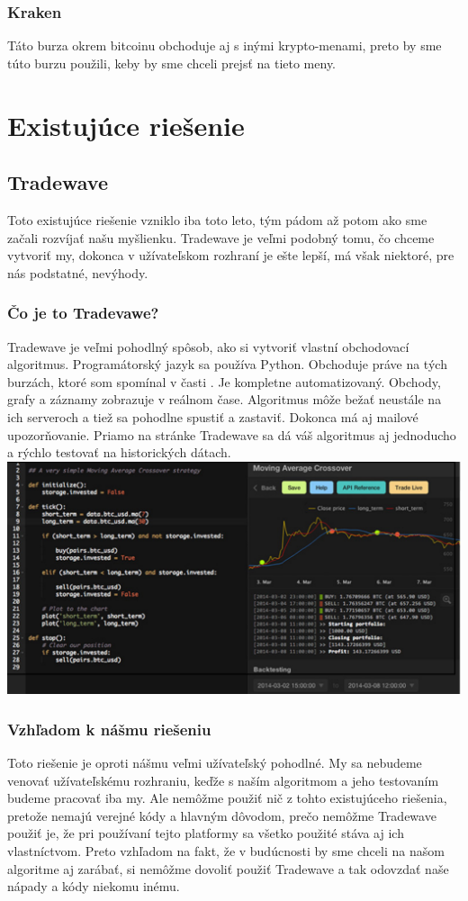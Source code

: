 \subsubsection{Kraken} 
Táto burza okrem bitcoinu obchoduje aj s inými krypto-menami, preto by sme túto burzu použili, keby by sme chceli prejsť na tieto meny. \cite{Kre} 
\section{Existujúce riešenie} 
\subsection{Tradewave} 
Toto existujúce riešenie vzniklo iba toto leto, tým pádom až potom ako sme začali rozvíjať našu myšlienku. Tradewave je veľmi podobný tomu, čo chceme vytvoriť my, dokonca v užívateľskom rozhraní je ešte lepší, má však niektoré, pre nás podstatné, nevýhody.  
\subsubsection{Čo je to Tradevawe?} 
Tradewave je veľmi pohodlný spôsob, ako si vytvoriť vlastní obchodovací algoritmus. Programátorský jazyk sa používa Python. Obchoduje práve na tých burzách, ktoré som spomínal v časti . Je kompletne automatizovaný. Obchody, grafy a záznamy zobrazuje v reálnom čase. Algoritmus môže bežať neustále na ich serveroch a tiež sa pohodlne spustiť a zastaviť. Dokonca má aj mailové upozorňovanie. Priamo na stránke Tradewave sa dá váš algoritmus aj jednoducho a rýchlo testovať na historických dátach.  \cite{Tw} 
\includegraphics[width=1\textwidth]{trade} 
\subsubsection{Vzhľadom k nášmu riešeniu} 
Toto riešenie je oproti nášmu veľmi užívateľský pohodlné. My sa nebudeme venovať užívateľskému rozhraniu, keďže s naším algoritmom a jeho testovaním budeme pracovať iba my. Ale nemôžme použiť nič z tohto existujúceho riešenia, pretože nemajú verejné kódy a hlavným dôvodom, prečo nemôžme Tradewave použiť je, že pri používaní tejto platformy sa všetko použité stáva aj ich vlastníctvom. Preto vzhľadom na fakt, že v budúcnosti by sme chceli na našom algoritme aj zarábať, si nemôžme dovoliť použiť Tradewave a tak odovzdať naše nápady a kódy niekomu inému. 
